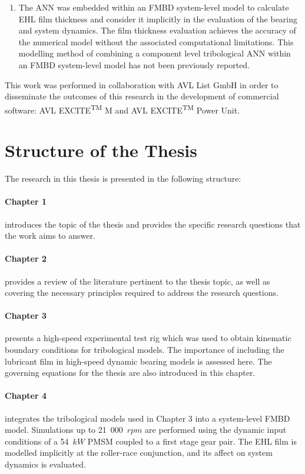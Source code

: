 \begin{enumerate}
	\item The ANN was embedded within an FMBD system-level model to calculate EHL film thickness and consider it implicitly in the evaluation of the bearing and system dynamics. The film thickness evaluation achieves the accuracy of the numerical model without the associated computational limitations. This modelling method of combining a component level tribological ANN within an FMBD system-level model has not been previously reported.
\end{enumerate}

This work was performed in collaboration with AVL List GmbH in order to disseminate the outcomes of this research in the development of commercial software: AVL EXCITE\textsuperscript{TM} M and AVL EXCITE\textsuperscript{TM} Power Unit.

\section{Structure of the Thesis} \label{Structure of Thesis}

The research in this thesis is presented in the following structure:

\paragraph{Chapter 1} introduces the topic of the thesis and provides the specific research questions that the work aims to answer.

\paragraph{Chapter 2} provides a review of the literature pertinent to the thesis topic, as well as covering the necessary principles required to address the research questions.

\paragraph{Chapter 3} presents a high-speed experimental test rig which was used to obtain kinematic boundary conditions for tribological models. The importance of including the lubricant film in high-speed dynamic bearing models is assessed here. The governing equations for the thesis are also introduced in this chapter.

\paragraph{Chapter 4} integrates the tribological models used in Chapter 3 into a system-level FMBD model. Simulations up to 21~000~$rpm$ are performed using the dynamic input conditions of a 54~$kW$ PMSM coupled to a first stage gear pair. The EHL film is modelled implicitly at the roller-race conjunction, and its affect on system dynamics is evaluated.

